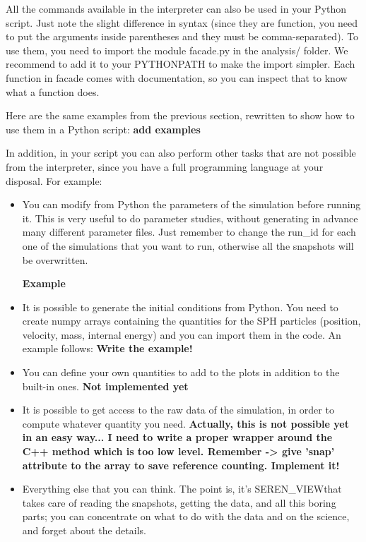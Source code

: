 \documentclass[a4paper]{article}
\newcommand{\CODENAME}{SEREN\_VIEW}
\begin{document}
All the commands available in the interpreter can also be used in your Python script. Just note the slight difference in syntax (since they are function, you need to put the arguments inside parentheses and they must be comma-separated). To use them, you need to import the module facade.py in the analysis/ folder. We recommend to add it to your PYTHONPATH to make the import simpler. Each function in facade comes with documentation, so you can inspect that to know what a function does.

Here are the same examples from the previous section, rewritten to show how to use them in a Python script:
\textbf{add examples}

In addition, in your script you can also perform other tasks that are not possible from the interpreter, since you have a full programming language at your disposal. For example:
\begin{itemize}

\item You can modify from Python the parameters of the simulation before running it. This is very useful to do parameter studies, without generating in advance many different parameter files. Just remember to change the run\_id for each one of the simulations that you want to run, otherwise all the snapshots will be overwritten.

\textbf{Example}

\item It is possible to generate the initial conditions from Python. You need to create numpy arrays containing the quantities for the SPH particles (position, velocity, mass, internal energy) and you can import them in the code. An example follows:
\textbf{Write the example!}

\item You can define your own quantities to add to the plots in addition to the built-in ones. \textbf{Not implemented yet}

\item It is possible to get access to the raw data of the simulation, in order to compute whatever quantity you need. \textbf{Actually, this is not possible yet in an easy way... I need to write a proper wrapper around the C++ method which is too low level. Remember -> give 'snap' attribute to the array to save reference counting. Implement it!}

\item Everything else that you can think. The point is, it's \CODENAME that takes care of reading the snapshots, getting the data, and all this boring parts; you can concentrate on what to do with the data and on the science, and forget about the details.

\end{itemize}
\end{document}
